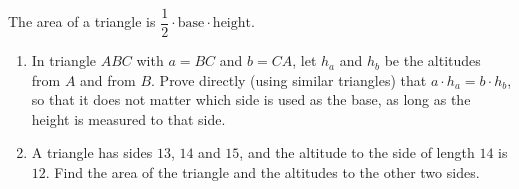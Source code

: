 The area of a triangle is $\dfrac12\cdot\text{base}\cdot\text{height}$.
\begin{enumerate}
\item[(a)] In triangle $ABC$ with $a=BC$ and $b=CA$, let $h_a$ and $h_b$ be the altitudes from $A$ and from $B$. Prove directly (using similar triangles) that $a\cdot h_a=b\cdot h_b$, so that it does not matter which side is used as the base, as long as the height is measured to that side.
\item[(b)] A triangle has sides $13$, $14$ and $15$, and the altitude to the side of length $14$ is $12$. Find the area of the triangle and the altitudes to the other two sides.
\end{enumerate}
